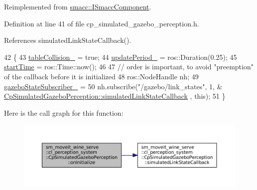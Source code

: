 Reimplemented from \hyperlink{classsmacc_1_1ISmaccComponent_ae6f71d008db12553912e9436184b9e65}{smacc\+::\+I\+Smacc\+Component}.



Definition at line 41 of file cp\+\_\+simulated\+\_\+gazebo\+\_\+perception.\+h.



References simulated\+Link\+State\+Callback().


\begin{DoxyCode}
42             \{                
43                 \hyperlink{classsm__moveit__wine__serve_1_1cl__perception__system_1_1CpSimulatedGazeboPerception_a90d93eaf8c58658b7db71cd8891714c8}{tableCollision\_} = \textcolor{keyword}{true};
44                 \hyperlink{classsm__moveit__wine__serve_1_1cl__perception__system_1_1CpSimulatedGazeboPerception_ab16e770dcf8d2ec2319939382da72227}{updatePeriod\_} = ros::Duration(0.25);
45                 \hyperlink{classsm__moveit__wine__serve_1_1cl__perception__system_1_1CpSimulatedGazeboPerception_a6bc563de34ceb9ca82d091dae225b37b}{startTime} = ros::Time::now();
46                 
47                 \textcolor{comment}{// order is important, to avoid "preemption" of the callback before it is initialized}
48                 ros::NodeHandle nh;
49                 \hyperlink{classsm__moveit__wine__serve_1_1cl__perception__system_1_1CpSimulatedGazeboPerception_ab894eaa9f509a33d6692891f50822a8a}{gazeboStateSubscriber\_} =
50                     nh.subscribe(\textcolor{stringliteral}{"/gazebo/link\_states"}, 1, &
      \hyperlink{classsm__moveit__wine__serve_1_1cl__perception__system_1_1CpSimulatedGazeboPerception_a38e80c3c39a9cc20ddca22f9c5c5355b}{CpSimulatedGazeboPerception::simulatedLinkStateCallback}
      , \textcolor{keyword}{this});
51             \}
\end{DoxyCode}
Here is the call graph for this function\+:
\nopagebreak
\begin{figure}[H]
\begin{center}
\leavevmode
\includegraphics[width=350pt]{classsm__moveit__wine__serve_1_1cl__perception__system_1_1CpSimulatedGazeboPerception_ad2360e1481edc4bd5732bb0e6deacea6_cgraph}
\end{center}
\end{figure}
